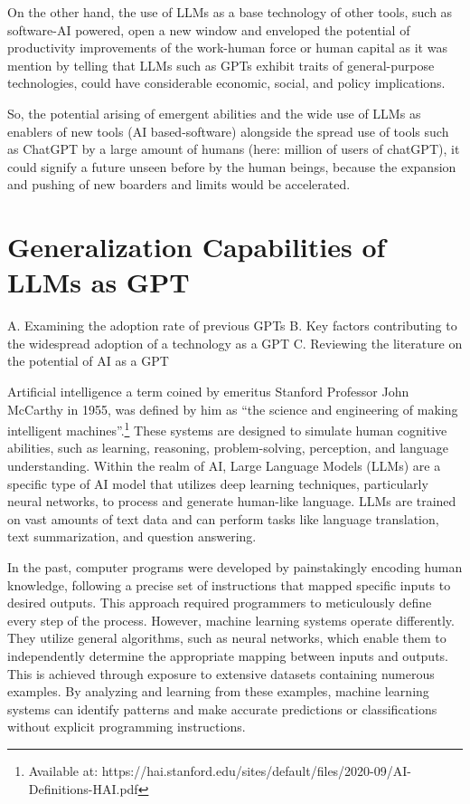 \documentclass[preprint, 3p,
authoryear]{elsarticle} %
\begin{document}
On the other hand, the use of LLMs as a base technology of other tools,
such as software-AI powered, open a new window and enveloped the
potential of productivity improvements of the work-human force or human
capital as it was mention by \citep{gptaregpts} telling that LLMs such
as GPTs exhibit traits of general-purpose technologies, could have
considerable economic, social, and policy implications.

So, the potential arising of emergent abilities and the wide use of LLMs
as enablers of new tools (AI based-software) alongside the spread use of
tools such as ChatGPT by a large amount of humans (here: million of
users of chatGPT), it could signify a future unseen before by the human
beings, because the expansion and pushing of new boarders and limits
would be accelerated.

\hypertarget{generalization-capabilities-of-llms-as-gpt}{%
\section{Generalization Capabilities of LLMs as
GPT}\label{generalization-capabilities-of-llms-as-gpt}}

A. Examining the adoption rate of previous GPTs B. Key factors
contributing to the widespread adoption of a technology as a GPT C.
Reviewing the literature on the potential of AI as a GPT

Artificial intelligence a term coined by emeritus Stanford Professor
John McCarthy in 1955, was defined by him as ``the science and
engineering of making intelligent machines''.\footnote{Available at:
  https://hai.stanford.edu/sites/default/files/2020-09/AI-Definitions-HAI.pdf}
These systems are designed to simulate human cognitive abilities, such
as learning, reasoning, problem-solving, perception, and language
understanding. Within the realm of AI, Large Language Models (LLMs) are
a specific type of AI model that utilizes deep learning techniques,
particularly neural networks, to process and generate human-like
language. LLMs are trained on vast amounts of text data and can perform
tasks like language translation, text summarization, and question
answering.

In the past, computer programs were developed by painstakingly encoding
human knowledge, following a precise set of instructions that mapped
specific inputs to desired outputs. This approach required programmers
to meticulously define every step of the process. However, machine
learning systems operate differently. They utilize general algorithms,
such as neural networks, which enable them to independently determine
the appropriate mapping between inputs and outputs. This is achieved
through exposure to extensive datasets containing numerous examples. By
analyzing and learning from these examples, machine learning systems can
identify patterns and make accurate predictions or classifications
without explicit programming instructions.
\end{document}
